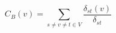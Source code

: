 \documentclass[12pt]{article}
\begin{document}
\[
C_B\left(v\right) = \sum_{s \neq v \neq t \in V}
    \frac{\delta_{st}\left(v\right)}{\delta_{st}}
\]
\end{document}
